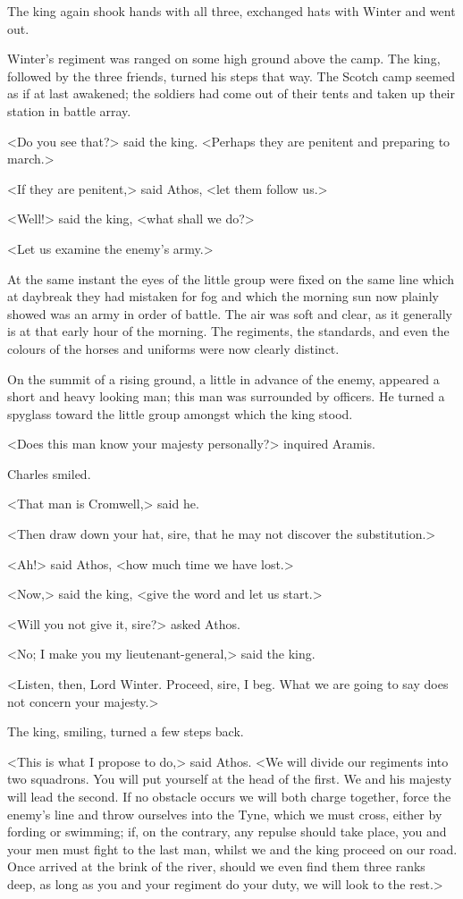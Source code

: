 The king again shook hands with all three, exchanged hats with Winter and went out.

Winter's regiment was ranged on some high ground above the camp. The king, followed by the three friends, turned his steps that way. The Scotch camp seemed as if at last awakened; the soldiers had come out of their tents and taken up their station in battle array.

<Do you see that?> said the king. <Perhaps they are penitent and preparing to march.>

<If they are penitent,> said Athos, <let them follow us.>

<Well!> said the king, <what shall we do?>

<Let us examine the enemy's army.>

At the same instant the eyes of the little group were fixed on the same line which at daybreak they had mistaken for fog and which the morning sun now plainly showed was an army in order of battle. The air was soft and clear, as it generally is at that early hour of the morning. The regiments, the standards, and even the colours of the horses and uniforms were now clearly distinct.

On the summit of a rising ground, a little in advance of the enemy, appeared a short and heavy looking man; this man was surrounded by officers. He turned a spyglass toward the little group amongst which the king stood.

<Does this man know your majesty personally?> inquired Aramis.

Charles smiled.

<That man is Cromwell,> said he.

<Then draw down your hat, sire, that he may not discover the substitution.>

<Ah!> said Athos, <how much time we have lost.>

<Now,> said the king, <give the word and let us start.>

<Will you not give it, sire?> asked Athos.

<No; I make you my lieutenant-general,> said the king.

<Listen, then, Lord Winter. Proceed, sire, I beg. What we are going to say does not concern your majesty.>

The king, smiling, turned a few steps back.

<This is what I propose to do,> said Athos. <We will divide our regiments into two squadrons. You will put yourself at the head of the first. We and his majesty will lead the second. If no obstacle occurs we will both charge together, force the enemy's line and throw ourselves into the Tyne, which we must cross, either by fording or swimming; if, on the contrary, any repulse should take place, you and your men must fight to the last man, whilst we and the king proceed on our road. Once arrived at the brink of the river, should we even find them three ranks deep, as long as you and your regiment do your duty, we will look to the rest.>

